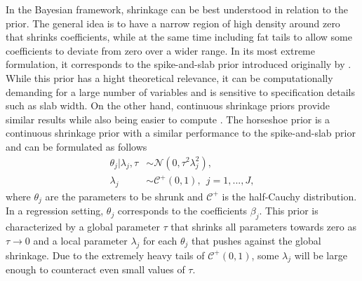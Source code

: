 In the Bayesian framework, shrinkage can be best understood in relation to the prior.
The general idea is to have a narrow region of high density around zero that shrinks coefficients,
while at the same time including fat tails to allow some coefficients to deviate from zero over a wider range.
In its most extreme formulation, it corresponds to the spike-and-slab prior introduced originally by \cite{mitchell_bayesian_1988}.
While this prior has a hight theoretical relevance, it can be computationally demanding for a large number of variables and is sensitive to specification details such as slab width.
On the other hand, continuous shrinkage priors provide similar results while also being easier to compute \citep{piironen_sparsity_2017}.
The horseshoe prior \cite{carvalho_horseshoe_2010} is a continuous shrinkage prior with a similar performance to the spike-and-slab prior and can be formulated as follows
\begin{equation}
    \begin{split}
        \theta_j | \lambda_j, \tau & \sim \mathcal N (0, \tau^2\lambda^2_j), \\
        \lambda_j & \sim \mathcal C^+ (0, 1), ~~ j = 1,..., J,
    \end{split}
    \label{eq_hs}
\end{equation}
where $\theta_j$ are the parameters to be shrunk and $\mathcal C^+$ is the half-Cauchy distribution. In a regression setting, $\theta_j$ corresponds to the coefficients $\beta_j$.
This prior is characterized by a global parameter $\tau$ that shrinks all parameters towards zero as $\tau \rightarrow 0$ and a local parameter $\lambda_j$ for each $\theta_j$ that pushes against the global shrinkage.
Due to the extremely heavy tails of $\mathcal C^+(0, 1)$, some $\lambda_j$ will be large enough to counteract even small values of $\tau$.

